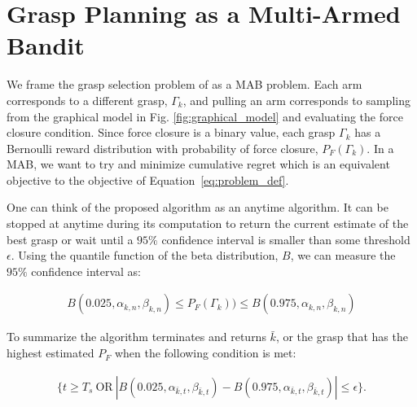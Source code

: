 \documentclass[10pt, conference]{ieeeconf}      %
\begin{document}
\section{Grasp Planning as a Multi-Armed Bandit}
We frame the grasp selection problem of  as a MAB problem.
Each arm corresponds to a different grasp, $\Gamma_k$, and pulling an arm corresponds to sampling from the graphical model in Fig. \ref{fig:graphical_model} and evaluating the force closure condition. Since force closure is a binary value, each grasp $\Gamma_k$ has a Bernoulli reward distribution with probability of force closure, $P_F(\Gamma_k)$.
In a MAB, we want to try and minimize cumulative regret which is an equivalent objective to the objective of Equation~\ref{eq:problem_def}.

One can think of the proposed algorithm as an anytime algorithm. It can be stopped at anytime during its computation to return the current estimate of the best grasp or wait until a $95\%$ confidence interval is smaller than some threshold $\epsilon$. Using the quantile function of the beta distribution, $B$, we can measure the $95\%$ confidence interval as: 

\vspace{-2ex}
\begin{align}\label{eq:confidence}
B(0.025,\alpha_{k,n},\beta_{k,n}) \leq P_F(\Gamma_k)) \leq B(0.975,\alpha_{k,n},\beta_{k,n})
\end{align}

To summarize the algorithm terminates and returns $\bar{k}$, or the grasp that has the highest estimated $P_F$ when the following condition is met:

\vspace{-2ex}
\begin{align}\label{eq:stopping_condition}
\lbrace t \geq T_s \: \mbox{OR} \: |B(0.025,\alpha_{\bar{k},t},\beta_{\bar{k},t}) -  B(0.975,\alpha_{\bar{k},t},\beta_{\bar{k},t})| \leq \epsilon \rbrace.
\end{align}
\end{document}
